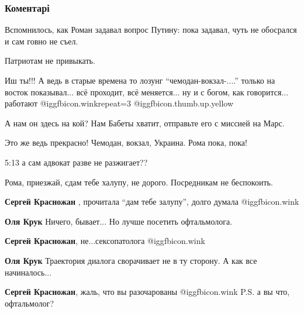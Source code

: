  
 
 
 
 
\subsubsection{Коментарі}

\begin{itemize} %
Вспомнилось, как Роман задавал вопрос Путину: пока задавал, чуть не обосрался и сам говно не съел.

Патриотам не привыкать.


Иш ты!!! А ведь в старые времена то лозунг \enquote{чемодан-вокзал-....} только на
восток показывал... всё проходит, всё меняется... ну и с богом, как
говорится... работают @igg{fbicon.wink}{repeat=3}  @igg{fbicon.thumb.up.yellow} 


А нам он здесь на кой? Нам Бабеты хватит, отправьте его с миссией на Марс.

Это же ведь прекрасно! Чемодан, вокзал, Украина. Рома пока, пока!

5:13 а сам адвокат разве не разжигает??

Рома, приезжай, сдам тебе халупу, не дорого. Посредникам не беспокоить.

\begin{itemize} %
\textbf{Сергей Красножан} , прочитала \enquote{дам тебе залупу}, долго думала  @igg{fbicon.wink} 

\textbf{Оля Крук} Ничего, бывает... Но лучше посетить офтальмолога.

\textbf{Сергей Красножан}, не...сексопатолога  @igg{fbicon.wink} 

\textbf{Оля Крук} Траектория диалога сворачивает не в ту сторону. А как все начиналось...

\textbf{Сергей Красножан}, жаль, что вы разочарованы  @igg{fbicon.wink} 
P.S. а вы что, офтальмолог?
\end{itemize} %


\end{itemize}
